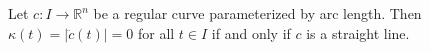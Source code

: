 Let $c: I \to \mathbb{R}^n$ be a regular curve parameterized by arc length. Then $\kappa(t) = |\ddot{c}(t)| = 0$ for all $t \in I$ if and only if $c$ is a straight line.